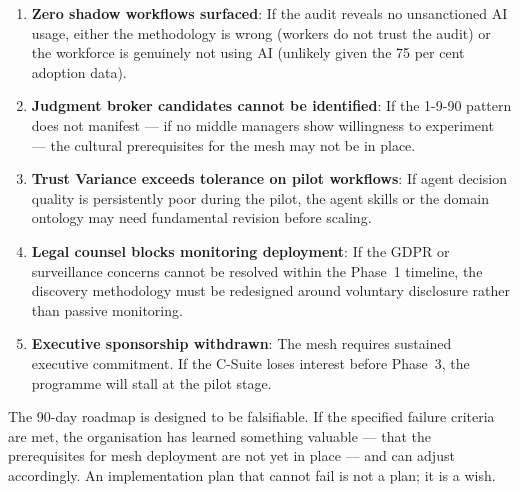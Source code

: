 \begin{enumerate}
  \item \textbf{Zero shadow workflows surfaced}: If the audit reveals no unsanctioned AI usage, either the methodology is wrong (workers do not trust the audit) or the workforce is genuinely not using AI (unlikely given the 75 per cent adoption data).
  \item \textbf{Judgment broker candidates cannot be identified}: If the 1-9-90 pattern does not manifest --- if no middle managers show willingness to experiment --- the cultural prerequisites for the mesh may not be in place.
  \item \textbf{Trust Variance exceeds tolerance on pilot workflows}: If agent decision quality is persistently poor during the pilot, the agent skills or the domain ontology may need fundamental revision before scaling.
  \item \textbf{Legal counsel blocks monitoring deployment}: If the GDPR or surveillance concerns cannot be resolved within the Phase~1 timeline, the discovery methodology must be redesigned around voluntary disclosure rather than passive monitoring.
  \item \textbf{Executive sponsorship withdrawn}: The mesh requires sustained executive commitment. If the C-Suite loses interest before Phase~3, the programme will stall at the pilot stage.
\end{enumerate}

\begin{keyinsight}
The 90-day roadmap is designed to be falsifiable. If the specified failure criteria are met, the organisation has learned something valuable --- that the prerequisites for mesh deployment are not yet in place --- and can adjust accordingly. An implementation plan that cannot fail is not a plan; it is a wish.
\end{keyinsight}
